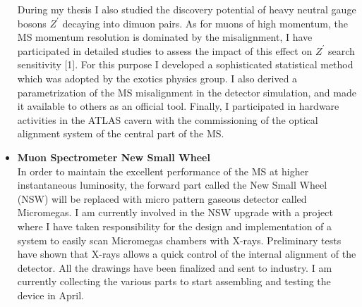 \documentclass[12pt]{article}
\begin{document}
\begin{itemize}[leftmargin=1.3cm]
 
During my thesis I also studied the discovery potential of heavy neutral gauge bosons $Z^{\prime}$ decaying into dimuon pairs. 
As for muons of high momentum, the MS momentum resolution is dominated by the misalignment, I have participated in detailed studies to assess the impact of this effect on $Z^{\prime}$ 
search sensitivity [1]. For this purpose I developed a sophisticated statistical method which was adopted by the exotics physics group. I also derived a parametrization of the MS misalignment 
in the detector simulation, and made it available to others as an official tool.
Finally, I participated in hardware activities in the ATLAS cavern with the 
commissioning of the optical alignment system of the central part of the MS.



\item[] {\bf Muon Spectrometer New Small Wheel}\\
In order to maintain the excellent performance of the MS at higher instantaneous luminosity, the forward part called the New Small Wheel (NSW)
will be replaced with micro pattern gaseous detector called Micromegas.
I am currently involved in the NSW upgrade with a project where I have taken responsibility for the design and implementation of a system to easily scan Micromegas 
chambers with X-rays. 
Preliminary tests have shown that X-rays allows a quick control of the internal alignment of the detector.
All the drawings have been finalized and sent to industry. I am currently collecting the various parts to start assembling and testing the device in April.
\vspace{2.5mm}



\end{itemize}
\end{document}
